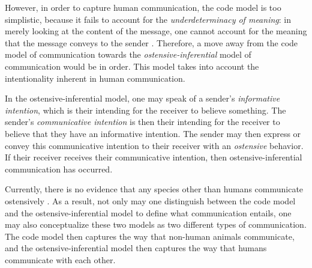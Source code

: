 However, in order to capture human communication, the code model is too simplistic, because it fails to account for the \emph{underdeterminacy of meaning}: in merely looking at the content of the message, one cannot account for the meaning that the message conveys to the sender \citep{Scott-Phillips18-communication}. 
Therefore, a move away from the code model of communication towards the \emph{ostensive-inferential} model of communication would be in order. This model takes into account the intentionality inherent in human communication.

In the ostensive-inferential model, one may speak of a sender's \emph{informative intention}, which is their intending for the receiver to believe something. The sender's \emph{communicative intention} is then their intending for the receiver to believe that they have an informative intention. The sender may then express or convey this communicative intention to their receiver with an \emph{ostensive} behavior. If their receiver receives their communicative intention, then ostensive-inferential communication has occurred.

Currently, there is no evidence that any species other than humans communicate ostensively \citep{Scott-Phillips18-communication}. As a result, not only may one distinguish between the code model and the ostensive-inferential model to define what communication entails, one may also conceptualize these two models as two different types of communication. The code model then captures the way that non-human animals communicate, and the ostensive-inferential model then captures the way that humans communicate with each other.

